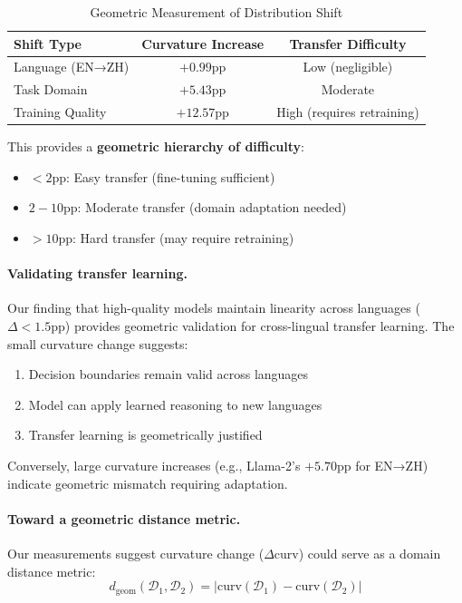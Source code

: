 \documentclass[11pt]{article}
\begin{document}
\begin{table}[h]
\centering
\caption{Geometric Measurement of Distribution Shift}
\begin{tabular}{lcc}
\toprule
\textbf{Shift Type} & \textbf{Curvature Increase} & \textbf{Transfer Difficulty} \\
\midrule
Language (EN→ZH) & $+0.99$pp & Low (negligible) \\
Task Domain & $+5.43$pp & Moderate \\
Training Quality & $+12.57$pp & High (requires retraining) \\
\bottomrule
\end{tabular}
\end{table}

This provides a \textbf{geometric hierarchy of difficulty}:
\begin{itemize}
    \item $< 2$pp: Easy transfer (fine-tuning sufficient)
    \item $2-10$pp: Moderate transfer (domain adaptation needed)
    \item $> 10$pp: Hard transfer (may require retraining)
\end{itemize}

\paragraph{Validating transfer learning.}
Our finding that high-quality models maintain linearity across languages ($\Delta < 1.5$pp) provides geometric validation for cross-lingual transfer learning. The small curvature change suggests:
\begin{enumerate}
    \item Decision boundaries remain valid across languages
    \item Model can apply learned reasoning to new languages
    \item Transfer learning is geometrically justified
\end{enumerate}

Conversely, large curvature increases (e.g., Llama-2's $+5.70$pp for EN→ZH) indicate geometric mismatch requiring adaptation.

\paragraph{Toward a geometric distance metric.}
Our measurements suggest curvature change ($\Delta$curv) could serve as a domain distance metric:
\begin{equation}
d_{\text{geom}}(\mathcal{D}_1, \mathcal{D}_2) = |\text{curv}(\mathcal{D}_1) - \text{curv}(\mathcal{D}_2)|
\end{equation}
\end{document}
